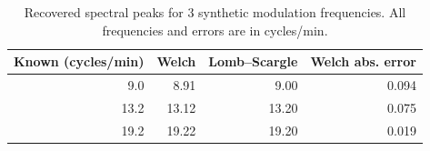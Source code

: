 \begin{table}[htbp]
\centering
\begin{tabular}{rrrr}
\toprule
Known (cycles/min) & Welch & Lomb--Scargle & Welch abs. error \\
\midrule
9.0 & 8.91 & 9.00 & 0.094 \\
13.2 & 13.12 & 13.20 & 0.075 \\
19.2 & 19.22 & 19.20 & 0.019 \\
\bottomrule
\end{tabular}
\caption{Recovered spectral peaks for 3 synthetic modulation frequencies. All frequencies and errors are in cycles/min.}

\label{tab:synthetic}
\end{table}
